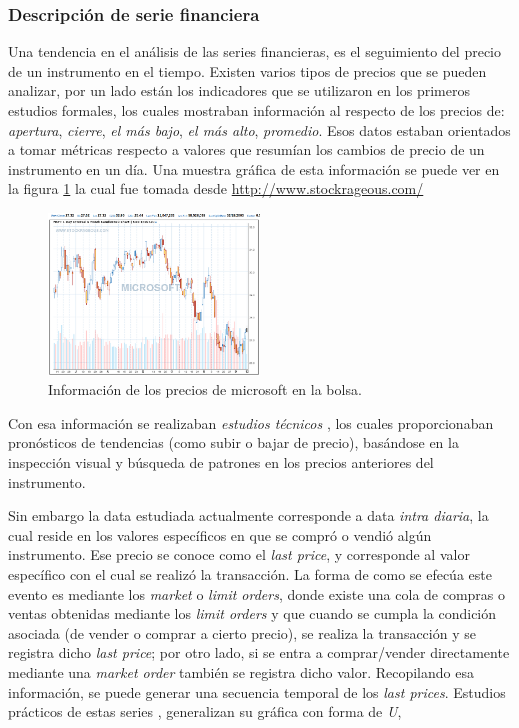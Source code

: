 \subsubsection{Descripción de serie financiera}

Una tendencia en el análisis de las series financieras, es el seguimiento del
precio de un instrumento en el tiempo.
Existen varios tipos de precios que se pueden analizar, por un lado están los
indicadores que se utilizaron en los primeros estudios formales, los cuales
mostraban información al respecto de los precios de: \emph{apertura},
\emph{cierre}, \emph{el más bajo}, \emph{el más alto}, \emph{promedio}. Esos
datos estaban orientados a tomar métricas respecto a valores que resumían los
cambios de precio de un instrumento en un día. Una muestra gráfica de esta
información se puede ver en la figura \ref{fig:microsoft} la cual fue 
tomada desde \url{http://www.stockrageous.com/}

\begin{figure}[h!t]
    \begin{center}
        \includegraphics[width=0.5\textwidth]{images/microsoft}
        \caption{Información de los precios de microsoft en la bolsa.}
        \label{fig:microsoft}
    \end{center}
\end{figure}

Con esa información se realizaban \emph{estudios técnicos}
\cite{taylor1992use}, los cuales proporcionaban pronósticos de tendencias (como
subir o bajar de precio), basándose en la inspección visual y búsqueda de
patrones en los precios anteriores del instrumento. 

Sin embargo la data estudiada actualmente corresponde a data \emph{intra
diaria}, la cual reside en los valores específicos en que se compró o vendió
algún instrumento.  Ese precio se conoce como el \emph{last price}, y
corresponde al valor específico con el cual se realizó la transacción. La forma
de como se efecúa este evento es mediante los \emph{market} o \emph{limit
orders}, donde existe una cola de compras o ventas obtenidas mediante los
\emph{limit orders} y que cuando se cumpla la condición asociada (de vender o
comprar a cierto precio), se realiza la transacción y se registra dicho
\emph{last price}; por otro lado, si se entra a comprar/vender directamente
mediante una \emph{market order} también se registra dicho valor. Recopilando
esa información, se puede generar una secuencia temporal de los \emph{last
prices}. Estudios prácticos de estas series \cite{biais2012empirical},
generalizan su gráfica con forma de \emph{U},

